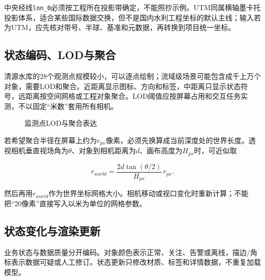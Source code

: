 中央经线\texttt{lon\_0}必须按工程所在投影带确定，不能照抄示例。UTM同属横轴墨卡托投影体系，适合某些国际数据交换，但不是国内水利工程坐标的默认主线；输入若为UTM，应先核对带号、半球、基准和元数据，再转换到项目统一坐标。

\subsection{状态编码、LOD与聚合}

清源水库的28个观测点规模较小，可以逐点绘制；流域级场景可能包含成千上万个对象，需要LOD和聚合。近距离显示图标、方向和标签，中距离只显示状态符号，远距离按空间网格或工程对象聚合。LOD阈值应按屏幕占用和交互任务实测，不以固定“米数”套用所有相机。

\begin{figure}[htbp]
\centering
{}
\caption{监测点LOD与聚合表达}
\label{fig:lod-cluster}
\end{figure}

若希望聚合半径在屏幕上约为$r_{px}$像素，必须先换算成当前深度处的世界长度。透视相机垂直视场角为$\theta$、对象到相机距离为$d$、画布高度为$H_{px}$时，可近似取

\[
r_{world}=\frac{2d\tan(\theta/2)}{H_{px}}\,r_{px}.
\]

然后再用$r_{world}$作为世界坐标网格大小。相机移动或视口变化时重新计算；不能把“20像素”直接写入以米为单位的网格参数。

\subsection{状态变化与渲染更新}

业务状态与数据质量分开编码。对象颜色表示正常、关注、告警或离线，描边/角标表示数据可疑或人工修订。状态更新只修改材质、标签和详情数据，不重复加载模型。

